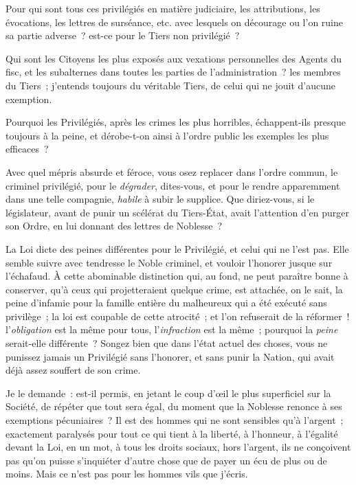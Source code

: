 \documentclass[french,twoside]{book} %
\begin{document}
Pour qui sont tous ces privilégiés en matière judiciaire, les attributions, les évocations, les lettres de surséance, etc. avec lesquels on décourage ou l’on ruine sa partie adverse ? est-ce pour le Tiers non privilégié ?\par
Qui sont les Citoyens les plus exposés aux vexations personnelles des Agents du fisc, et les subalternes dans toutes les parties de l’administration ? les membres du Tiers ; j’entends toujours du véritable Tiers, de celui qui ne jouit d’aucune exemption.\par
Pourquoi les Privilégiés, après les crimes les plus horribles, échappent-ils presque toujours à la peine, et dérobe-t-on ainsi à l’ordre public les exemples les plus efficaces ?\par
Avec quel mépris absurde et féroce, vous osez replacer dans l’ordre commun, le criminel privilégié, pour le {\itshape dégrader}, dites-vous, et pour le rendre apparemment dans une telle compagnie, {\itshape habile} à subir le supplice. Que diriez-vous, si le législateur, avant de punir un scélérat du Tiers-État, avait l’attention d’en purger son Ordre, en lui donnant des lettres de Noblesse ?\par
La Loi dicte des peines différentes pour le Privilégié, et celui qui ne l’est pas. Elle semble suivre avec tendresse le Noble criminel, et vouloir l’honorer jusque sur l’échafaud. À cette abominable distinction qui, au fond, ne peut paraître bonne à conserver, qu’à ceux qui projetteraient quelque crime, est attachée, on le sait, la peine d’infamie pour la famille entière du malheureux qui a été exécuté sans privilège ; la loi est coupable de cette atrocité ; et l’on refuserait de la réformer ! l’{\itshape obligation} est la même pour tous, l’{\itshape infraction} est la même ; pourquoi la {\itshape peine} serait-elle différente ? Songez bien que dans l’état actuel des choses, vous ne punissez jamais un Privilégié sans l’honorer, et sans punir la Nation, qui avait déjà assez souffert de son crime.\par
Je le demande : est-il permis, en jetant le coup d’œil le plus superficiel sur la Société, de répéter que tout sera égal, du moment que la Noblesse renonce à ses exemptions pécuniaires ? Il est des hommes qui ne sont sensibles qu’à l’argent ; exactement paralysés pour tout ce qui tient à la liberté, à l’honneur, à l’égalité devant la Loi, en un mot, à tous les droits sociaux, hors l’argent, ils ne conçoivent pas qu’on puisse s’inquiéter d’autre chose que de payer un écu de plus ou de moins. Mais ce n’est pas pour les hommes vils que j’écris.\par
\end{document}
